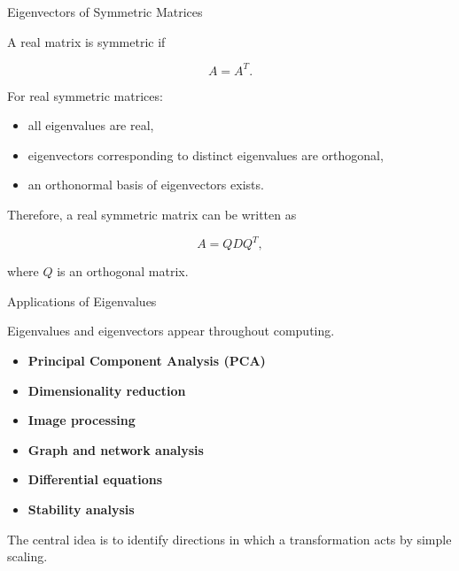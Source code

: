 \begin{frame}{Eigenvectors of Symmetric Matrices}

A real matrix is symmetric if

\[
\boxed{
A=A^T.
}
\]

For real symmetric matrices:

\begin{itemize}
    \item all eigenvalues are real,
    \item eigenvectors corresponding to distinct eigenvalues
    are orthogonal,
    \item an orthonormal basis of eigenvectors exists.
\end{itemize}

Therefore, a real symmetric matrix can be written as

\[
\boxed{
A=QDQ^T,
}
\]

where $Q$ is an orthogonal matrix.

\end{frame}



\begin{frame}{Applications of Eigenvalues}

Eigenvalues and eigenvectors appear throughout computing.

\begin{itemize}
    \item \textbf{Principal Component Analysis (PCA)}
    \item \textbf{Dimensionality reduction}
    \item \textbf{Image processing}
    \item \textbf{Graph and network analysis}
    \item \textbf{Differential equations}
    \item \textbf{Stability analysis}
\end{itemize}

\vspace{0.4cm}

The central idea is to identify directions in which a
transformation acts by simple scaling.

\end{frame}